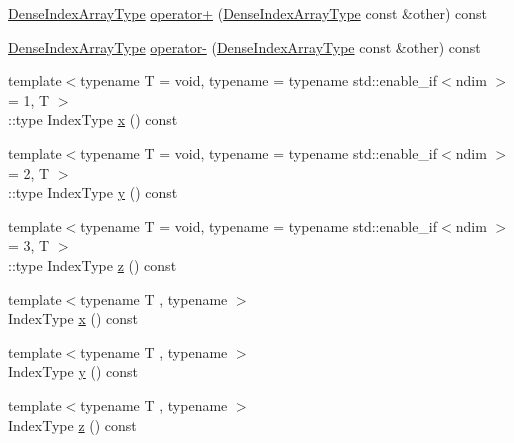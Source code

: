 \begin{DoxyCompactItemize}
\item 
\hyperlink{structvt_1_1index_1_1_dense_index_array_aec95c4ed1b4071d31d24142f02429dbd}{Dense\+Index\+Array\+Type} \hyperlink{structvt_1_1index_1_1_dense_index_array_a2f63f2603e58cf017c07f11f9e233409}{operator+} (\hyperlink{structvt_1_1index_1_1_dense_index_array_aec95c4ed1b4071d31d24142f02429dbd}{Dense\+Index\+Array\+Type} const \&other) const
\item 
\hyperlink{structvt_1_1index_1_1_dense_index_array_aec95c4ed1b4071d31d24142f02429dbd}{Dense\+Index\+Array\+Type} \hyperlink{structvt_1_1index_1_1_dense_index_array_a828670d9617980741517481c39b8212f}{operator-\/} (\hyperlink{structvt_1_1index_1_1_dense_index_array_aec95c4ed1b4071d31d24142f02429dbd}{Dense\+Index\+Array\+Type} const \&other) const
\item 
{\footnotesize template$<$typename T  = void, typename  = typename std\+::enable\+\_\+if$<$ndim $>$= 1, T $>$ }\\\+::type Index\+Type \hyperlink{structvt_1_1index_1_1_dense_index_array_a0604b24914af854d09d4da97eae4ef74}{x} () const
\item 
{\footnotesize template$<$typename T  = void, typename  = typename std\+::enable\+\_\+if$<$ndim $>$= 2, T $>$ }\\\+::type Index\+Type \hyperlink{structvt_1_1index_1_1_dense_index_array_a6f150c2dbed44d633b4dc3b62aea2c9b}{y} () const
\item 
{\footnotesize template$<$typename T  = void, typename  = typename std\+::enable\+\_\+if$<$ndim $>$= 3, T $>$ }\\\+::type Index\+Type \hyperlink{structvt_1_1index_1_1_dense_index_array_a8de61716f67863e9c1eca84f8c99de22}{z} () const
\item 
{\footnotesize template$<$typename T , typename $>$ }\\Index\+Type \hyperlink{structvt_1_1index_1_1_dense_index_array_af5731c29e392485535d090b57b66a6f5}{x} () const
\item 
{\footnotesize template$<$typename T , typename $>$ }\\Index\+Type \hyperlink{structvt_1_1index_1_1_dense_index_array_a23d6673153f284a46bad6e1be6781e08}{y} () const
\item 
{\footnotesize template$<$typename T , typename $>$ }\\Index\+Type \hyperlink{structvt_1_1index_1_1_dense_index_array_a9bd7a86415c7ce861f5cf17dd5a849e0}{z} () const
\end{DoxyCompactItemize}
